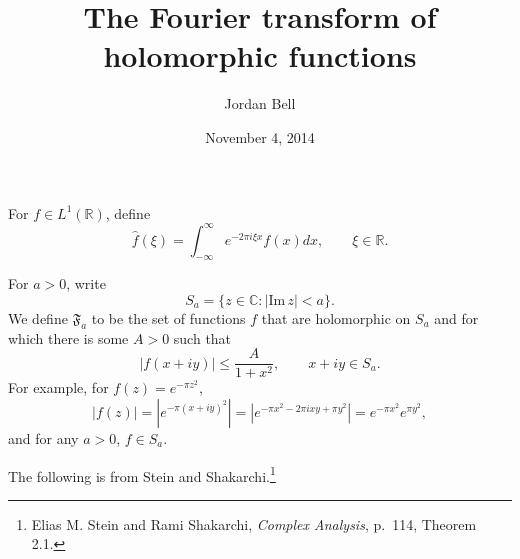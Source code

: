 \documentclass{article}
\def\Im{\ensuremath{\mathrm{Im}}\,}
\theoremstyle{definition}
\begin{document}
\title{The Fourier transform of holomorphic functions}
\author{Jordan Bell}
\date{November 4, 2014}

\maketitle

For $f \in L^1(\mathbb{R})$, define
\[
\widehat{f}(\xi) = \int_{-\infty}^\infty e^{-2\pi i\xi x} f(x) dx,
\qquad \xi \in \mathbb{R}.
\]

For $a>0$, write
\[
S_a = \{z \in \mathbb{C}: |\Im z|<a\}.
\]
We define $\mathfrak{F}_a$ to be the set of functions $f$ that are holomorphic on $S_a$ and for which there
is some $A>0$ such that
\begin{equation}
|f(x+iy)| \leq \frac{A}{1+x^2}, \qquad x+iy \in S_a.
\label{Sa}
\end{equation}
For example, for $f(z)=e^{-\pi z^2}$, 
\[
|f(z)| = |e^{-\pi(x+iy)^2}| = |e^{-\pi x^2 - 2\pi i xy + \pi y^2}|
=e^{-\pi x^2} e^{\pi y^2},
\]
and for any $a>0$, $f \in S_a$. 

The following is from Stein and Shakarchi.\footnote{Elias M. Stein and Rami Shakarchi, {\em Complex Analysis},
p.~114, Theorem 2.1.}
\end{document}
